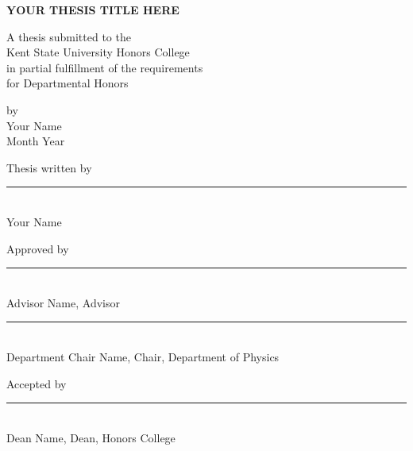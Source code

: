 
\begin{titlepage}
  \centering
  \vspace*{1in}

  {\Large\bfseries YOUR THESIS TITLE HERE \par}

  \vspace{1.5in}

  A thesis submitted to the \\
  Kent State University Honors College \\
  in partial fulfillment of the requirements \\
  for Departmental Honors

  \vspace{1in}

  by \\[0.5em]
  {\large Your Name} \\[0.5em]
  Month Year

  \vfill

  \begin{flushleft}
    \noindent Thesis written by \\[1em]
    \rule{3in}{0.4pt} \\
    Your Name \\ \medskip

    \noindent Approved by \\[1em]
    \rule{3in}{0.4pt} \\
    Advisor Name, Advisor \\[1em]
    \rule{3in}{0.4pt} \\
    Department Chair Name, Chair, Department of Physics \\ \medskip

    \noindent Accepted by \\[1em]
    \rule{3in}{0.4pt} \\
    Dean Name, Dean, Honors College
  \end{flushleft}

\end{titlepage}
